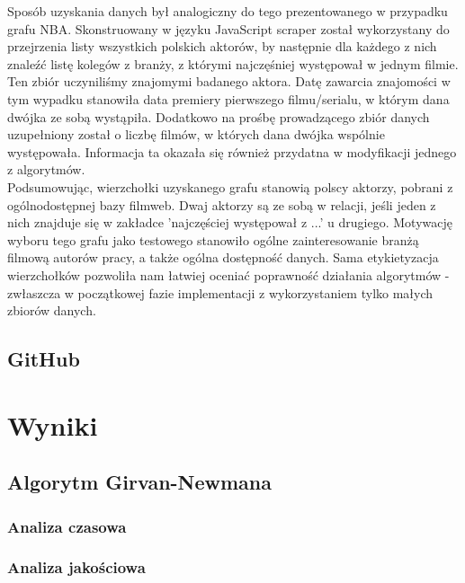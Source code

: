 \documentclass{article}
\begin{document}
Sposób uzyskania danych był analogiczny do tego prezentowanego w przypadku grafu NBA. Skonstruowany w języku JavaScript scraper został wykorzystany do przejrzenia listy wszystkich polskich aktorów, by następnie dla każdego z nich znaleźć listę kolegów z branży, z którymi najczęśniej występował w jednym filmie. Ten zbiór uczyniliśmy znajomymi badanego aktora. Datę zawarcia znajomości w tym wypadku stanowiła data premiery pierwszego filmu/serialu, w którym dana dwójka ze sobą wystąpiła. Dodatkowo na prośbę prowadzącego zbiór danych uzupełniony został o liczbę filmów, w których dana dwójka wspólnie występowała. Informacja ta okazała się również przydatna w modyfikacji jednego z algorytmów.\\

Podsumowując, wierzchołki uzyskanego grafu stanowią polscy aktorzy, pobrani z ogólnodostępnej bazy filmweb. Dwaj aktorzy są ze sobą w relacji, jeśli jeden z nich znajduje się w zakładce 'najczęściej występował z ...' u drugiego. Motywację wyboru tego grafu jako testowego stanowiło ogólne zainteresowanie branżą filmową autorów pracy, a także ogólna dostępność danych. Sama etykietyzacja wierzchołków pozwoliła nam łatwiej oceniać poprawność działania algorytmów - zwłaszcza w początkowej fazie implementacji z wykorzystaniem tylko małych zbiorów danych.

\subsection{GitHub}

\section{Wyniki}

\subsection{Algorytm Girvan-Newmana}
\subsubsection{Analiza czasowa}
\subsubsection{Analiza jakościowa}
\end{document}
